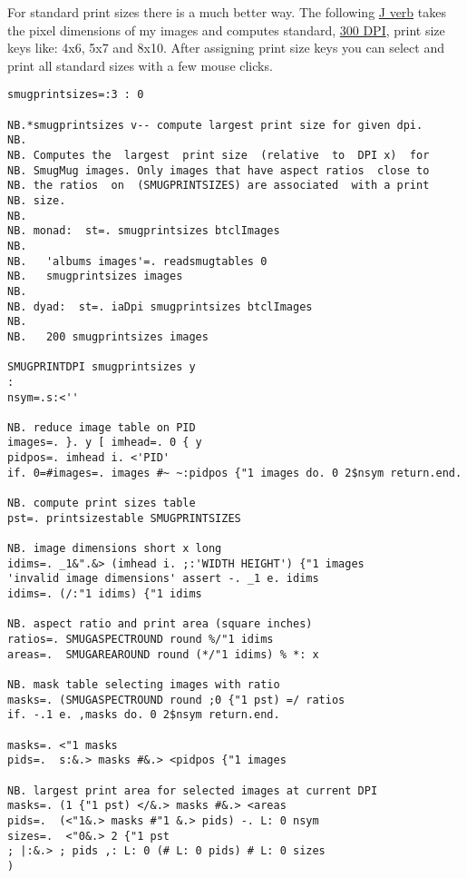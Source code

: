 For standard print sizes there is a much better way. The following
\href{http://www.jsoftware.com/}{J verb} takes the pixel dimensions of
my images and computes standard,
\href{http://www.rideau-info.com/photos/mythdpi.html}{300 DPI}, print
size keys like: 4x6, 5x7 and 8x10. After assigning print size keys you
can select and print all standard sizes with a few mouse clicks.


\begin{lstlisting}[language=jdoc, frame=single,framerule=0pt,label=lst:scr442X0]
smugprintsizes=:3 : 0

NB.*smugprintsizes v-- compute largest print size for given dpi.
NB.
NB. Computes the  largest  print size  (relative  to  DPI x)  for
NB. SmugMug images. Only images that have aspect ratios  close to
NB. the ratios  on  (SMUGPRINTSIZES) are associated  with a print
NB. size.
NB.
NB. monad:  st=. smugprintsizes btclImages
NB.
NB.   'albums images'=. readsmugtables 0
NB.   smugprintsizes images
NB.
NB. dyad:  st=. iaDpi smugprintsizes btclImages
NB.
NB.   200 smugprintsizes images

SMUGPRINTDPI smugprintsizes y
:
nsym=.s:<''

NB. reduce image table on PID
images=. }. y [ imhead=. 0 { y
pidpos=. imhead i. <'PID'
if. 0=#images=. images #~ ~:pidpos {"1 images do. 0 2$nsym return.end.

NB. compute print sizes table
pst=. printsizestable SMUGPRINTSIZES

NB. image dimensions short x long
idims=. _1&".&> (imhead i. ;:'WIDTH HEIGHT') {"1 images
'invalid image dimensions' assert -. _1 e. idims
idims=. (/:"1 idims) {"1 idims

NB. aspect ratio and print area (square inches)
ratios=. SMUGASPECTROUND round %/"1 idims
areas=.  SMUGAREAROUND round (*/"1 idims) % *: x

NB. mask table selecting images with ratio
masks=. (SMUGASPECTROUND round ;0 {"1 pst) =/ ratios
if. -.1 e. ,masks do. 0 2$nsym return.end.

masks=. <"1 masks
pids=.  s:&.> masks #&.> <pidpos {"1 images

NB. largest print area for selected images at current DPI
masks=. (1 {"1 pst) </&.> masks #&.> <areas
pids=.  (<"1&.> masks #"1 &.> pids) -. L: 0 nsym
sizes=.  <"0&.> 2 {"1 pst
; |:&.> ; pids ,: L: 0 (# L: 0 pids) # L: 0 sizes
)
\end{lstlisting}


%